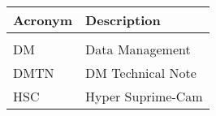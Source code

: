 \addtocounter{table}{-1}
\begin{longtable}{p{}p{}}\hline
\textbf{Acronym} & \textbf{Description}  \\\hline

 &  \\\hline
DM & Data Management \\\hline
DMTN & DM Technical Note \\\hline
HSC & Hyper Suprime-Cam \\\hline
\end{longtable}
